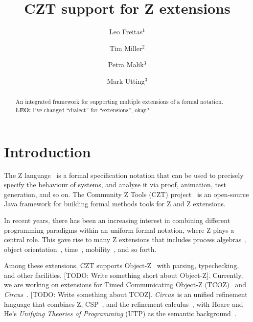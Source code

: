 \documentclass{llncs}
\newcommand{\Circus}{{\sf\slshape Circus}}
\begin{document}
\title{CZT support for Z extensions}
\author{Leo Freitas$^1$ \and Tim Miller$^2$ \and Petra Malik$^3$ \and Mark Utting$^3$}


\maketitle


\begin{abstract}
  An integrated framework for supporting multiple extensions of a formal
  notation.
  {\bf LEO:} I've changed ``dialect'' for ``extensions'', okay?
\end{abstract}

\section{Introduction} \label{sec:intro}

  The Z language~\cite{isoz} is a formal specification notation that
  can be used to precisely specify the behaviour of systems, and
  analyse it via proof, animation, test generation, and so on.  The Community
  Z Tools (CZT) project~\cite{czt} is an open-source Java framework
  for building formal methods tools for Z and Z extensions.

  In recent years, there has been an increasing interest in combining
  different programming paradigms within an uniform formal notation,
  where Z plays a central role. This gave rise to many Z extensions that
  includes process algebras~\cite{fischer-1998,fischer-2000,circus.sem:intro},
  object orientation~\cite{oz,ohcircus}, time~\cite{tcoz,circus.sem:real.time2},
  mobility~\cite{circus.sem:mobility}, and so forth.

  Among these extensions, CZT supports Object-Z~\cite{oz} with
  parsing, typechecking, and other facilities.  [TODO: Write something
  short about Object-Z].  Currently, we are working on extensions for
  Timed Communicating Object-Z (TCOZ)~\cite{tcoz} and
  \Circus~\cite{circus.sem:intro}.  [TODO: Write something about
  TCOZ].  \Circus\ is an unified refinement language that combines Z,
  CSP~\cite{csp.books:roscoe}, and the refinement
  calculus~\cite{fm.ref:morgan}, with Hoare and He's \textit{Unifying
  Theories of Programming} (UTP) as the semantic
  background~\cite{hoare.utp}.
\end{document}
